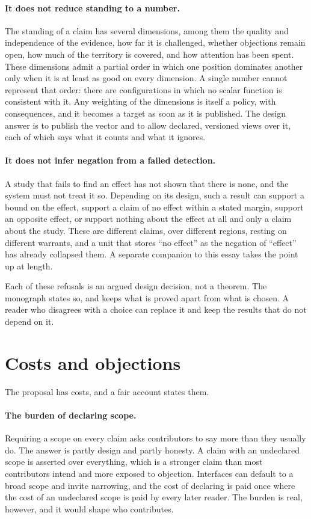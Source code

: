 \documentclass[11pt]{article}
\begin{document}
\paragraph{It does not reduce standing to a number.} The standing of a claim has several dimensions, among them the quality and independence of the evidence, how far it is challenged, whether objections remain open, how much of the territory is covered, and how attention has been spent. These dimensions admit a partial order in which one position dominates another only when it is at least as good on every dimension. A single number cannot represent that order: there are configurations in which no scalar function is consistent with it. Any weighting of the dimensions is itself a policy, with consequences, and it becomes a target as soon as it is published. The design answer is to publish the vector and to allow declared, versioned views over it, each of which says what it counts and what it ignores.

\paragraph{It does not infer negation from a failed detection.} A study that fails to find an effect has not shown that there is none, and the system must not treat it so. Depending on its design, such a result can support a bound on the effect, support a claim of no effect within a stated margin, support an opposite effect, or support nothing about the effect at all and only a claim about the study. These are different claims, over different regions, resting on different warrants, and a unit that stores ``no effect'' as the negation of ``effect'' has already collapsed them. A separate companion to this essay takes the point up at length.

Each of these refusals is an argued design decision, not a theorem. The monograph states so, and keeps what is proved apart from what is chosen. A reader who disagrees with a choice can replace it and keep the results that do not depend on it.

\section{Costs and objections}\label{sec:costs}

The proposal has costs, and a fair account states them.

\paragraph{The burden of declaring scope.} Requiring a scope on every claim asks contributors to say more than they usually do. The answer is partly design and partly honesty. A claim with an undeclared scope is asserted over everything, which is a stronger claim than most contributors intend and more exposed to objection. Interfaces can default to a broad scope and invite narrowing, and the cost of declaring is paid once where the cost of an undeclared scope is paid by every later reader. The burden is real, however, and it would shape who contributes.
\end{document}
